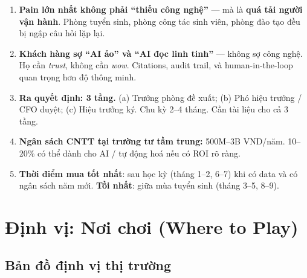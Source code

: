 \documentclass[11pt,a4paper]{article}
\begin{document}
\begin{enumerate}
\item \textbf{Pain lớn nhất không phải ``thiếu công nghệ''} --- mà là \textbf{
quá tải người vận hành}. Phòng tuyển sinh, phòng công tác sinh viên, phòng đào
tạo đều bị ngập câu hỏi lặp lại.

\item \textbf{Khách hàng sợ ``AI ảo'' và ``AI đọc linh tinh''} --- không sợ
công nghệ. Họ cần \textit{trust}, không cần \textit{wow}. Citations, audit
trail, và human-in-the-loop quan trọng hơn độ thông minh.

\item \textbf{Ra quyết định: 3 tầng.} (a) Trưởng phòng đề xuất; (b) Phó hiệu
trưởng / CFO duyệt; (c) Hiệu trưởng ký. Chu kỳ 2--4 tháng. Cần tài liệu cho cả 3 tầng.

\item \textbf{Ngân sách CNTT tại trường tư tầm trung:} 500M--3B VND/năm. 10--20\%
có thể dành cho AI / tự động hoá nếu có ROI rõ ràng.

\item \textbf{Thời điểm mua tốt nhất}: sau học kỳ (tháng 1--2, 6--7) khi có
data và có ngân sách năm mới. \textbf{Tồi nhất}: giữa mùa tuyển sinh (tháng
3--5, 8--9).
\end{enumerate}

\clearpage

\section{Định vị: Nơi chơi (Where to Play)}

\subsection{Bản đồ định vị thị trường}
\end{document}
